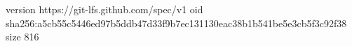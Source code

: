 version https://git-lfs.github.com/spec/v1
oid sha256:a5cb55c5446ed97b5ddb47d33f9b7ec131130eac38b1b541be5e3cb5f3c92f38
size 816
